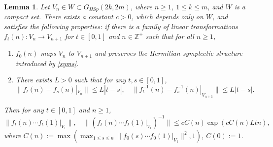 \documentclass[11pt]{amsart}
\newtheorem{lemma}[theorem]{Lemma}
\theoremstyle{remark}
\theoremstyle{definition}
\begin{document}
\begin{lemma}\label{lem: key esti}
Let $V_n \in W \subset G_{HSp}(2k, 2m)$, where $n \geq 1$, $1 \leq k \leq m$, and $W$ is a compact set. There exists a constant $c > 0$, which depends only on $W$, and satisfies the following properties: if there is a family of linear transformations $f_t(n): V_n \to V_{n+1}$ for $t \in [0, 1]$ and $n \in \mathbb{Z}^+$ such that for all $n \geq 1$,
\begin{enumerate}
    \item $f_0(n)$ maps $V_n$ to $V_{n+1}$ and preserves the Hermitian symplectic structure introduced by \eqref{syms}.
\item 
There exists $L > 0$ such that for any $t, s \in [0, 1]$, $$\|f_t(n) - f_s(n)|_{V_n}\| \leq L|t - s|, \quad \|f_t^{-1}(n) - f_s^{-1}(n)|_{V_{n+1}}\| \leq L|t - s|.$$
\end{enumerate}
Then for any $t \in [0, 1]$ and $n \geq 1$,
\begin{equation}\label{eqn: key variation}
\|f_t(n) \cdots f_t(1)|_{V_1}\|, \quad \|(f_t(n) \cdots f_t(1)|_{V_1})^{-1}\| \leq cC(n)\exp(cC(n)Ltn),
\end{equation}where $C(n):=\max(\max_{1\leq s\leq n}\|f_0(s)\cdots f_0(1)|_{V_1}\|^2,1)$, $C(0):=1$.
\end{lemma}
\end{document}
